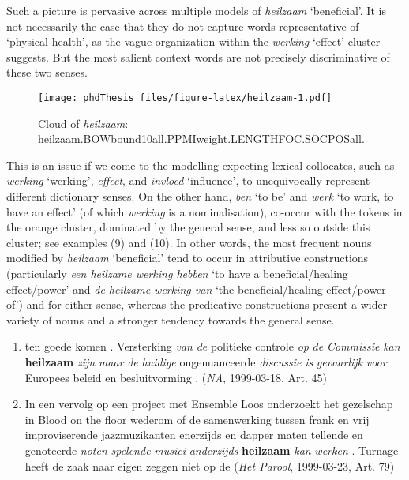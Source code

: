 \documentclass[
]{book}
\begin{document}
Such a picture is pervasive across multiple models of \emph{heilzaam} `beneficial'. It is not necessarily the case that they do not capture words representative of `physical health', as the vague organization within the \emph{werking} `effect' cluster suggests. But the most salient context words are not precisely discriminative of these two senses.



\begin{figure}
\centering
\texttt{[image: phdThesis\_files/figure-latex/heilzaam-1.pdf]}
\caption{\label{fig:heilzaam}Cloud of \emph{heilzaam}: heilzaam.BOWbound10all.PPMIweight.LENGTHFOC.SOCPOSall.}
\end{figure}

This is an issue if we come to the modelling expecting lexical collocates, such as \emph{werking} `werking', \emph{effect}, and \emph{invloed} `influence', to unequivocally represent different dictionary senses. On the other hand, \emph{ben} `to be' and \emph{werk} `to work, to have an effect' (of which \emph{werking} is a nominalisation), co-occur with the tokens in the orange cluster, dominated by the general sense, and less so outside this cluster; see examples (9) and (10).
In other words, the most frequent nouns modified by \emph{heilzaam} `beneficial' tend to occur in attributive constructions (particularly \emph{een heilzame werking hebben} `to have a beneficial/healing effect/power' and \emph{de heilzame werking van} `the beneficial/healing effect/power of') and for either sense, whereas the predicative constructions present a wider variety of nouns and a stronger tendency towards the general sense.

\begin{enumerate}
\def\labelenumi{(\arabic{enumi})}
\setcounter{enumi}{8}
\item
  ten goede komen . Versterking \emph{van} \emph{de} politieke controle \emph{op} \emph{de} \emph{Commissie} \emph{kan} \textbf{heilzaam} \emph{zijn} \emph{maar} \emph{de} \emph{huidige} ongenuanceerde \emph{discussie} \emph{is} \emph{gevaarlijk} \emph{voor} Europees beleid en besluitvorming . (\emph{NA}, 1999-03-18, Art. 45)
\item
  In een vervolg op een project met Ensemble Loos onderzoekt het gezelschap in Blood on the floor wederom of de samenwerking tussen frank en vrij improviserende jazzmuzikanten enerzijds en dapper maten tellende en genoteerde \emph{noten} \emph{spelende} \emph{musici} \emph{anderzijds} \textbf{heilzaam} \emph{kan} \emph{werken} . Turnage heeft de zaak naar eigen zeggen niet op de (\emph{Het Parool}, 1999-03-23, Art. 79)
\end{enumerate}
\end{document}
